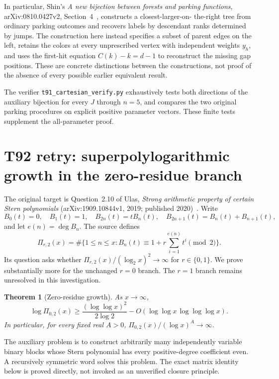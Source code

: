 \documentclass[11pt,a4paper]{article}
\newtheorem{theorem}{Theorem}[section]
\theoremstyle{definition}
\theoremstyle{remark}
\begin{document}
In particular, Shin's \emph{A new bijection between forests and parking
functions}, arXiv:0810.0427v2, Section~4~\cite{RetryShin2008}, constructs a closest-larger-on-
the-right tree from ordinary parking outcomes and recovers labels by
descendant ranks determined by jumps. The construction here instead
specifies a subset of parent edges on the left, retains the colors at
every unprescribed vertex with independent weights $y_h$, and uses the
first-hit equation $C(k)-k=d-1$ to reconstruct the missing gap positions.
These are concrete distinctions between the constructions, not proof of
the absence of every possible earlier equivalent result.

The verifier \texttt{t91\_cartesian\_verify.py} exhaustively tests both
directions of the auxiliary bijection for every $J$ through $n=5$, and
compares the two original parking procedures on explicit positive
parameter vectors. These finite tests supplement the all-parameter proof.


\section{T92 retry: superpolylogarithmic growth in the zero-residue branch}

The original target is Question~2.10 of Ulas,
\emph{Strong arithmetic property of certain Stern polynomials}
(arXiv:1909.10844v1, 2019; published 2020)~\cite{retry:ulas}. Write
\[
 B_0(t)=0,\quad B_1(t)=1,\quad B_{2n}(t)=tB_n(t),\quad
 B_{2n+1}(t)=B_n(t)+B_{n+1}(t),
\]
and let $e(n)=\deg B_n$. The source defines
\[
 \Pi_{r,2}(x)=\#\{1\le n\le x:
 B_n(t)\equiv1+r\sum_{i=1}^{e(n)}t^i\pmod2\}.
\]
Its question asks whether $\Pi_{r,2}(x)/(\log_2x)^2\to\infty$ for
$r\in\{0,1\}$. We prove substantially more for the unchanged $r=0$
branch. The $r=1$ branch remains unresolved in this investigation.

\begin{theorem}[Zero-residue growth]
As $x\to\infty$,
\[
 \log\Pi_{0,2}(x)\ge
 \frac{(\log\log x)^2}{2\log2}
 -O(\log\log x\,\log\log\log x).
\]
In particular, for every fixed real $A>0$,
$\Pi_{0,2}(x)/(\log x)^A\to\infty$.
\end{theorem}

The auxiliary problem is to construct arbitrarily many independently
variable binary blocks whose Stern polynomial has every positive-degree
coefficient even. A recursively symmetric word solves this problem.
The exact matrix identity below is proved directly, not invoked as an
unverified closure principle.
\end{document}
